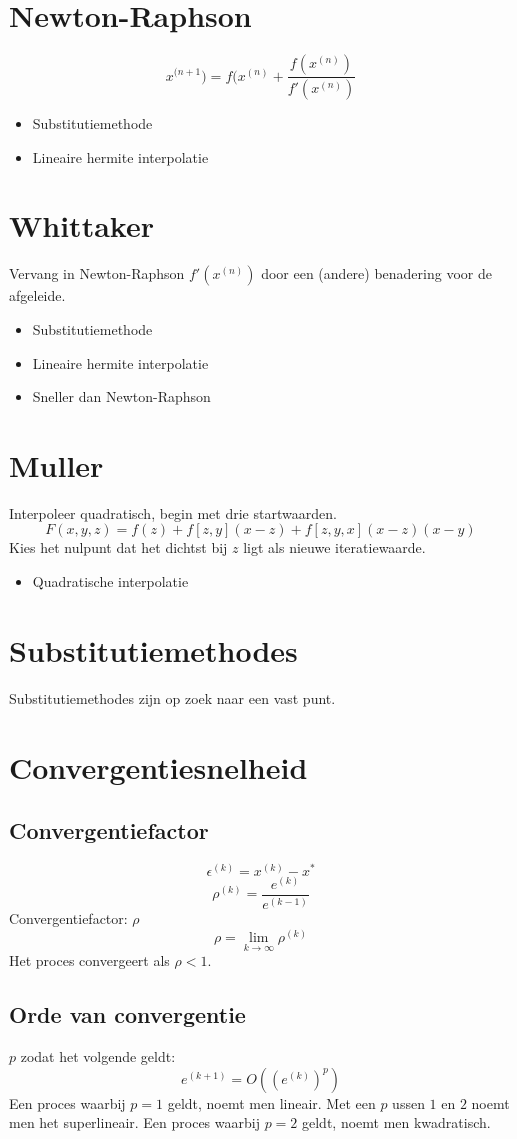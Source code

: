\documentclass[samenvatting.tex]{subfiles}
\begin{document}
\section{Newton-Raphson}
\[
x^{(n+1}) = f(x^{(n)}+\frac{f(x^{(n)})}{f'(x^{(n)})} 
\]
\begin{itemize}
\item Substitutiemethode
\item Lineaire hermite interpolatie
\end{itemize}

\section{Whittaker}
Vervang in Newton-Raphson $f'(x^{(n)})$ door een (andere) benadering voor de afgeleide.
\begin{itemize}
\item Substitutiemethode
\item Lineaire hermite interpolatie
\item Sneller dan Newton-Raphson
\end{itemize}

\section{Muller}
Interpoleer quadratisch, begin met drie startwaarden.
\[ 
F(x,y,z) = f(z) + f[z,y](x-z)+ f[z,y,x](x-z)(x-y)
\]
Kies het nulpunt dat het dichtst bij $z$ ligt als nieuwe iteratiewaarde.

\begin{itemize}
\item Quadratische interpolatie
\end{itemize}

\section{Substitutiemethodes}
Substitutiemethodes zijn op zoek naar een vast punt.

\section{Convergentiesnelheid}
\subsection{Convergentiefactor}
\[
\epsilon^{(k)} = x^{(k)}-x^{*}
\]
\[
\rho^{(k)} = \frac{e^{(k)}}{e^{(k-1)}}
\]
Convergentiefactor: $\rho$
\[
\rho = \lim_{k\rightarrow\infty}\rho^{(k)}
\]
Het proces convergeert als $\rho < 1$.
\subsection{Orde van convergentie}
$p$ zodat het volgende geldt:
\[
e^{(k+1)} = O((e^{(k)})^p)
\]
Een proces waarbij $p = 1$ geldt, noemt men lineair.
Met een $p$ ussen $1$ en $2$ noemt men het superlineair.
Een proces waarbij $p=2$ geldt, noemt men kwadratisch.
\end{document}
